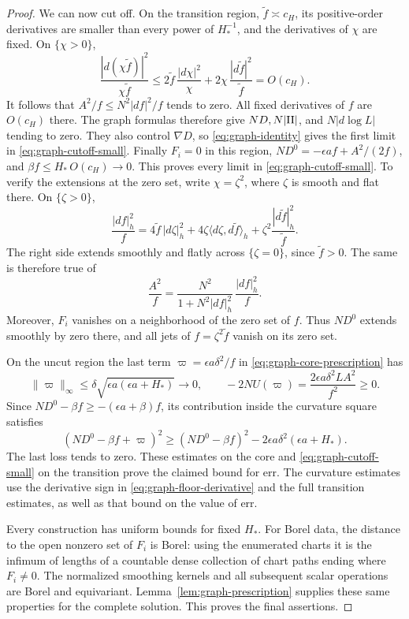 \begin{proof}
We can now cut off.  On the transition region,
\(\widetilde f\asymp c_H\), its positive-order derivatives are
smaller than every power of \(H_*^{-1}\), and the derivatives
of \(\chi\) are fixed.  On \(\{\chi>0\}\),
\[
 \frac{|d(\chi\widetilde f)|^2}{\chi\widetilde f}
 \le
 2\widetilde f\,\frac{|d\chi|^2}{\chi}
       +2\chi\,\frac{|d\widetilde f|^2}{\widetilde f}
 =O(c_H).
\]
It follows that \(A^2/f\le N^2|df|^2/f\) tends to zero.
All fixed derivatives of \(f\) are \(O(c_H)\) there.
The graph formulas therefore give \(ND,N|\mathrm{II}|\), and
\(N|d\log L|\) tending to zero.  They also control
\(\nabla D\), so \eqref{eq:graph-identity} gives the first
limit in \eqref{eq:graph-cutoff-small}.  Finally \(F_i=0\) in
this region, \(ND^0=-\epsilon af+A^2/(2f)\), and
\(\beta f\le H_*\,O(c_H)\to0\).  This proves every limit in
\eqref{eq:graph-cutoff-small}.  To verify the extensions at the zero
set, write \(\chi=\zeta^2\), where \(\zeta\) is smooth and flat there.
On \(\{\zeta>0\}\),
\[
 \frac{|df|_h^2}{f}
 =4\widetilde f\,|d\zeta|_h^2
   +4\zeta\langle d\zeta,d\widetilde f\rangle_h
   +\zeta^2\frac{|d\widetilde f|_h^2}{\widetilde f}.
\]
The right side extends smoothly and flatly across \(\{\zeta=0\}\),
since \(\widetilde f>0\).  The same is therefore true of
\[
 \frac{A^2}{f}
 =\frac{N^2}{1+N^2|df|_h^2}\,\frac{|df|_h^2}{f}.
\]
Moreover, \(F_i\) vanishes on a neighborhood of the zero set of
\(f\).  Thus \(ND^0\) extends smoothly by zero there, and all jets
of \(f=\zeta^2\widetilde f\) vanish on its zero set.

On the uncut region the last term
\(\varpi=\epsilon a\delta^2/f\) in
\eqref{eq:graph-core-prescription} has
\begin{equation}
 \|\varpi\|_\infty
 \le\delta\sqrt{\epsilon a(\epsilon a+H_*)}\longrightarrow0,
 \qquad
 -2NU(\varpi)
   =\frac{2\epsilon a\delta^2 L A^2}{f^2}\ge0 .
 \label{eq:graph-floor-derivative}
\end{equation}
Since \(ND^0-\beta f\ge-(\epsilon a+\beta)f\), its contribution
inside the curvature square satisfies
\begin{equation}
 (ND^0-\beta f+\varpi)^2
 \ge (ND^0-\beta f)^2
        -2\epsilon a\delta^2(\epsilon a+H_*).
 \label{eq:graph-floor-square}
\end{equation}
The last loss tends to zero.  These estimates on the core and
\eqref{eq:graph-cutoff-small} on the transition prove the
claimed bound for \(\mathrm{err}\).  The curvature estimates
use the derivative sign in \eqref{eq:graph-floor-derivative}
and the full transition estimates, as well as that bound on
the value of \(\mathrm{err}\).

Every construction has uniform bounds for fixed \(H_*\).
For Borel data, the distance to the open nonzero set of \(F_i\)
is Borel: using the enumerated charts it is the infimum of
lengths of a countable dense collection of chart paths ending
where \(F_i\ne0\).  The normalized smoothing kernels and all
subsequent scalar operations are Borel and equivariant.
Lemma~\ref{lem:graph-prescription} supplies these same
properties for the complete solution.  This proves the final
assertions.
\end{proof}

